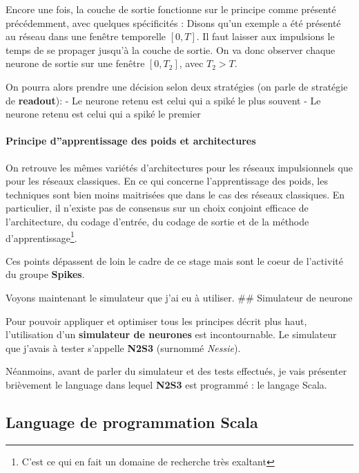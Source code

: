 Encore une fois, la couche de sortie fonctionne sur le principe comme
présenté précédemment, avec quelques spécificités : Disons qu'un exemple
a été présenté au réseau dans une fenêtre temporelle \([0,T]\). Il faut
laisser aux impulsions le temps de se propager jusqu'à la couche de
sortie. On va donc observer chaque neurone de sortie sur une fenêtre
\([0, T_2]\), avec \(T_2 > T\).

On pourra alors prendre une décision selon deux stratégies (on parle de
stratégie de \textbf{readout}): - Le neurone retenu est celui qui a
spiké le plus souvent - Le neurone retenu est celui qui a spiké le
premier

\hypertarget{principe-dapprentissage-des-poids-et-architectures}{%
\paragraph{Principe d''apprentissage des poids et
architectures}\label{principe-dapprentissage-des-poids-et-architectures}}

On retrouve les mêmes variétés d'architectures pour les réseaux
impulsionnels que pour les réseaux classiques. En ce qui concerne
l'apprentissage des poids, les techniques sont bien moins maitrisées que
dans le cas des réseaux classiques. En particulier, il n'existe pas de
consensus sur un choix conjoint efficace de l'architecture, du codage
d'entrée, du codage de sortie et de la méthode
d'apprentissage\footnote{C'est ce qui en fait un domaine de recherche très exaltant}.

Ces points dépassent de loin le cadre de ce stage mais sont le coeur de
l'activité du groupe \textbf{Spikes}.

Voyons maintenant le simulateur que j'ai eu à utiliser. \#\# Simulateur
de neurone

Pour pouvoir appliquer et optimiser tous les principes décrit plus haut,
l'utilisation d'un \textbf{simulateur de neurones} est incontournable.
Le simulateur que j'avais à tester s'appelle \textbf{N2S3} (surnommé
\emph{Nessie}).

Néanmoins, avant de parler du simulateur et des tests effectués, je vais
présenter brièvement le language dans lequel \textbf{N2S3} est programmé
: le langage Scala.

\hypertarget{language-de-programmation-scala}{%
\subsection{Language de programmation
Scala}\label{language-de-programmation-scala}}

